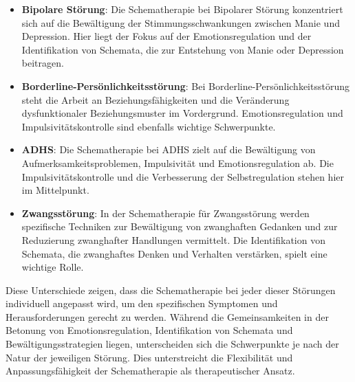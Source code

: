 \begin{itemize}
  \item \textbf{Bipolare Störung}: Die Schematherapie bei Bipolarer Störung konzentriert sich auf die Bewältigung der Stimmungsschwankungen zwischen Manie und Depression. Hier liegt der Fokus auf der Emotionsregulation und der Identifikation von Schemata, die zur Entstehung von Manie oder Depression beitragen.
  
  \item \textbf{Borderline-Persönlichkeitsstörung}: Bei Borderline-Persönlichkeitsstörung steht die Arbeit an Beziehungsfähigkeiten und die Veränderung dysfunktionaler Beziehungsmuster im Vordergrund. Emotionsregulation und Impulsivitätskontrolle sind ebenfalls wichtige Schwerpunkte.
  
  \item \textbf{ADHS}: Die Schematherapie bei ADHS zielt auf die Bewältigung von Aufmerksamkeitsproblemen, Impulsivität und Emotionsregulation ab. Die Impulsivitätskontrolle und die Verbesserung der Selbstregulation stehen hier im Mittelpunkt.
  
  \item \textbf{Zwangsstörung}: In der Schematherapie für Zwangsstörung werden spezifische Techniken zur Bewältigung von zwanghaften Gedanken und zur Reduzierung zwanghafter Handlungen vermittelt. Die Identifikation von Schemata, die zwanghaftes Denken und Verhalten verstärken, spielt eine wichtige Rolle.
\end{itemize}
%
Diese Unterschiede zeigen, dass die Schematherapie bei jeder dieser Störungen individuell angepasst wird, um den spezifischen Symptomen und Herausforderungen gerecht zu werden. Während die Gemeinsamkeiten in der Betonung von Emotionsregulation, Identifikation von Schemata und Bewältigungsstrategien liegen, unterscheiden sich die Schwerpunkte je nach der Natur der jeweiligen Störung. Dies unterstreicht die Flexibilität und Anpassungsfähigkeit der Schematherapie als therapeutischer Ansatz.